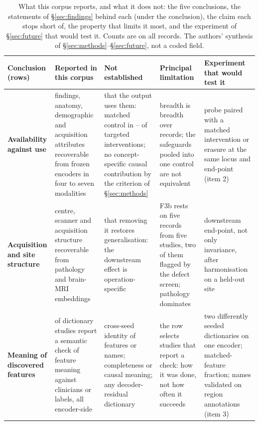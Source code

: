 \begin{table}[!tb]
\centering\footnotesize\setlength\tabcolsep{3pt}\renewcommand{\arraystretch}{1.08}
\caption{What this corpus reports, and what it does not: the five conclusions, the statements of
\S\ref{sec:findings} behind each (under the conclusion), the claim each stops short of, the property that limits it most, and the
experiment of \S\ref{sec:future} that would test it. Counts are on all records. The authors' synthesis of
\S\ref{sec:methods}--\S\ref{sec:future}, not a coded field.}
\label{tab:synthesis}
\begin{tabular}{@{}L{2.45cm}L{3.3cm}L{3.2cm}L{3.2cm}L{3.2cm}@{}}
\toprule
Conclusion (rows) & Reported in this corpus & Not established & Principal limitation & Experiment that would test it \\
\midrule
\textbf{Availability against use}  & findings, anatomy, demographic and acquisition attributes recoverable from frozen encoders in four to seven modalities & that the output uses them: matched control in \Vspca{}--\Vspc{} of \Vspcn{} targeted interventions; no concept-specific causal contribution by the criterion of \S\ref{sec:methods} & breadth is breadth over records; the safeguards pooled into one control are not equivalent & probe paired with a matched intervention or erasure at the same locus and end-point (item 2) \\
\addlinespace[2pt]
\textbf{Acquisition and site structure}  & centre, scanner and acquisition structure recoverable from pathology and brain-MRI embeddings & that removing it restores generalisation: the downstream effect is operation-specific & F3b rests on five records from five studies, two of them flagged by the defect screen; pathology dominates & downstream end-point, not only invariance, after harmonisation on a held-out site \\
\addlinespace[2pt]
\textbf{Meaning of discovered features}  & \Nsaeval{} of \Nsae{} dictionary studies report a semantic check of feature meaning against clinicians or labels, all encoder-side & cross-seed identity of features or names; completeness or causal meaning; any decoder-residual dictionary & the row selects studies that report a check: how it was done, not how often it succeeds & two differently seeded dictionaries on one encoder; matched-feature fraction; names validated on region annotations (item 3) \\

\end{tabular}
\end{table}
